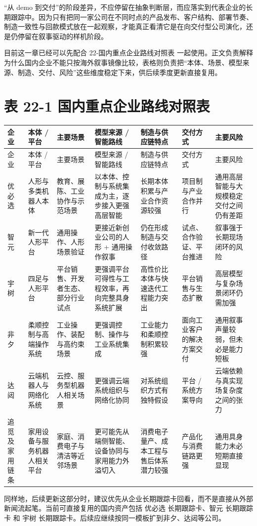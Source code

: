 “从 demo 到交付”的阶段差异，不应停留在抽象判断层，而应落实到代表企业的长期跟踪中。因为只有把同一家公司在不同时点的产品发布、客户结构、部署节奏、制造一致性与回款模式放在一起观察，才能真正看清它是在向交付型公司演化，还是仍停留在叙事驱动的样机阶段。

目前这一章已经可以先配合 22-国内重点企业路线对照表 一起使用。正文负责解释为什么国内企业不能只按海外叙事镜像比较，表格则负责把“本体、场景、模型来源、制造、交付、风险”这些维度稳定下来，供后续季度更新直接复用。

\chapter*{表 22-1 国内重点企业路线对照表}

\begingroup
\small
\begin{xltabular}{\textwidth}{YYYYYYY}
\toprule
企业 & 本体 / 平台 & 主要场景 & 模型来源 / 智能路线 & 制造与供应链特点 & 交付方式 & 主要风险 \\
\midrule
\endfirsthead
\toprule
企业 & 本体 / 平台 & 主要场景 & 模型来源 / 智能路线 & 制造与供应链特点 & 交付方式 & 主要风险 \\
\midrule
\endhead
优必选 & 人形与多类机器人本体 & 教育、展陈、工业协作与示范场景 & 以本体、控制与系统集成为主，逐步接入更强高层智能 & 长期本体积累与产业合作资源较强 & 项目制与产业合作并行 & 通用高层智能与大规模稳定交付之间仍有差距 \\
智元 & 新一代人形平台 & 通用操作、人形场景验证 & 更接近新创业公司的人形 + 通用操作叙事 & 仍在形成制造与交付收敛路径 & 试点、合作验证、平台推进 & 叙事强于长期现场闭环的风险 \\
宇树 & 四足与人形平台 & 平台销售、开发者生态、部分行业试点 & 更强调平台可得性与工程效率，再向完整具身系统扩展 & 高性价比本体与快速迭代工程能力突出 & 平台销售与生态扩散 & 高层模型与复杂场景闭环仍需加强 \\
非夕 & 柔顺控制与高端操作系统 & 工业操作、装配与高约束场景 & 更强调控制、操作与工业系统集成 & 工业能力和柔顺控制积累较强 & 面向工业客户的解决方案交付 & 通用叙事声量较弱，但未必是能力短板 \\
达闼 & 云端机器人与网络化系统 & 云控、服务型机器人相关场景 & 更强调云端系统组织与网络化协同 & 对系统组织方式有独特假设 & 平台 / 系统方案导向 & 云端依赖与真实现场复杂度之间的张力 \\
追觅及家用链条 & 家用设备与服务机器人相关平台 & 家庭、消费电子与清洁等近邻场景 & 更可能先从端侧智能、设备协同与家用能力外溢切入 & 消费电子量产、成本工程与售后体系潜力较强 & 产品化与消费链路更强 & 通用具身能力未必短期直接显现 \\
\bottomrule
\end{xltabular}
\endgroup

同样地，后续更新这部分时，建议优先从企业长期跟踪卡回看，而不是直接从外部新闻流起笔。当前可直接复用的国内资产包括 优必选 长期跟踪卡、智元 长期跟踪卡 和 宇树 长期跟踪卡。后续应继续按同一模板扩到非夕、达闼等公司。

